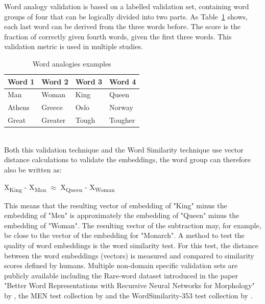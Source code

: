 \documentclass[../../Thesis.tex]{subfiles}
\begin{document}
\begin{jumpin}
Word analogy validation is based on a labelled validation set, containing word groups of four that can be logically divided into two parts. As Table~\ref{table:wordAnalogies} shows, each last word can be derived from the three words before. The score is the fraction of correctly given fourth words, given the first three words. This validation metric is used in multiple studies\cite{mikolov2013distributed, mikolov2013efficient, dai2015document, pennington2014glove}.\\
\begin{table}[hbt]
\begin{center}
\begin{tabular}{|l|l||l|l|}
\hline
\textbf{Word 1} & \textbf{Word 2} & \textbf{Word 3} & \textbf{Word 4}\\
\hline
\hline
Man & Woman & King & Queen \\
\hline
Athens & Greece & Oslo & Norway\\
\hline
Great & Greater & Tough & Tougher\\
\hline
\end{tabular}
\end{center}
\caption{Word analogies examples}\label{table:wordAnalogies}
\end{table}\\
Both this validation technique and the Word Similarity technique use vector distance calculations to validate the embeddings, the word group can therefore also be written as:
\begin{displayquote}
    X\textsubscript{King} - X\textsubscript{Man} $\approx$  X\textsubscript{Queen} - X\textsubscript{Woman}
\end{displayquote}
This means that the resulting vector of embedding of "King" minus the embedding of "Men" is approximately the embedding of "Queen" minus the embedding of "Woman". The resulting vector of the subtraction may, for example, be close to the vector of the embedding for "Monarch".
A method to test the quality of word embeddings is the word similarity test. For this test, the distance between the word embeddings (vectors) is measured and compared to similarity scores defined by humans. Multiple non-domain specific validation sets are publicly available including the Rare-word dataset introduced in the paper "Better Word Representations with Recursive Neural Networks for Morphology" by \citet{luong2013better}, 
the MEN test collection by \citet{EBruniMENCollection} and the WordSimilarity-353 test collection by \citet{EGabrilovichWScollection}.

\end{jumpin}
\end{document}
